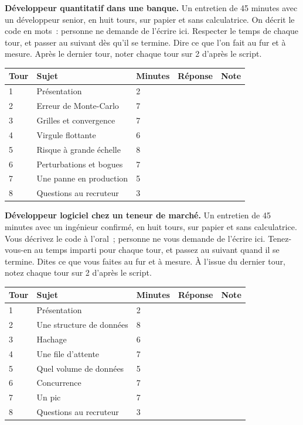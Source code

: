 \vfill\clearpage
\begin{question}\label{iq:iv2:mock-interviews:6}
\textbf{Développeur quantitatif dans une banque.} Un entretien de 45 minutes avec un développeur senior, en huit tours, sur papier et sans calculatrice. On décrit le code en mots~: personne ne demande de l'écrire ici. Respecter le temps de chaque tour, et passer au suivant dès qu'il se termine. Dire ce que l'on fait au fur et à mesure. Après le dernier tour, noter chaque tour sur 2 d'après le script.

\medskip
\begin{tabular}{@{}l|l|l|l|l@{}}
Tour & Sujet & Minutes & Réponse & Note \\ \hline
1 & Présentation & 2 & & \\[6pt]\hline
2 & Erreur de Monte-Carlo & 7 & & \\[6pt]\hline
3 & Grilles et convergence & 7 & & \\[6pt]\hline
4 & Virgule flottante & 6 & & \\[6pt]\hline
5 & Risque à grande échelle & 8 & & \\[6pt]\hline
6 & Perturbations et bogues & 7 & & \\[6pt]\hline
7 & Une panne en production & 5 & & \\[6pt]\hline
8 & Questions au recruteur & 3 & & \\[6pt]\hline
\end{tabular}
\end{question}

\vfill\clearpage
\begin{question}\label{iq:iv2:mock-interviews:7}
\textbf{Développeur logiciel chez un teneur de marché.} Un entretien de 45 minutes avec un ingénieur confirmé, en huit tours, sur papier et sans calculatrice. Vous décrivez le code à l'oral~; personne ne vous demande de l'écrire ici. Tenez-vous-en au temps imparti pour chaque tour, et passez au suivant quand il se termine. Dites ce que vous faites au fur et à mesure. À l'issue du dernier tour, notez chaque tour sur 2 d'après le script.

\medskip
\begin{tabular}{@{}l|l|l|l|l@{}}
Tour & Sujet & Minutes & Réponse & Note \\ \hline
1 & Présentation & 2 & & \\[6pt]\hline
2 & Une structure de données & 8 & & \\[6pt]\hline
3 & Hachage & 6 & & \\[6pt]\hline
4 & Une file d'attente & 7 & & \\[6pt]\hline
5 & Quel volume de données & 5 & & \\[6pt]\hline
6 & Concurrence & 7 & & \\[6pt]\hline
7 & Un pic & 7 & & \\[6pt]\hline
8 & Questions au recruteur & 3 & & \\[6pt]\hline
\end{tabular}
\end{question}


